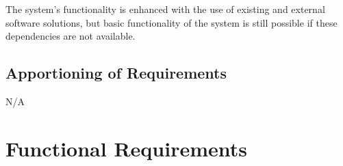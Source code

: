 \documentclass[]{article}
\begin{document}
The system's functionality is enhanced with the use of existing and external software solutions, but basic functionality of the system is still possible if these dependencies are not available.

\subsection{Apportioning of Requirements}
\label{sub:apportioning_of_requirements}
N/A


\newpage
\section{Functional Requirements}
\label{sec:functional_requirements}
\end{document}
